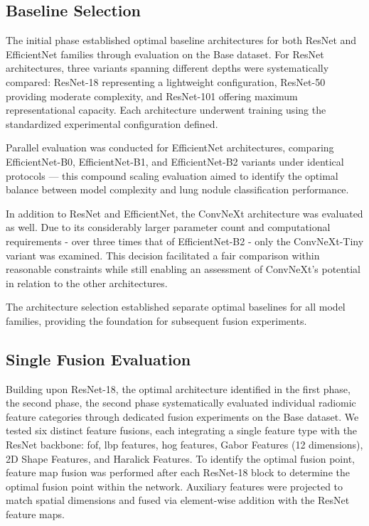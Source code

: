 \subsection{Baseline Selection}
The initial phase established optimal baseline architectures for both ResNet and EfficientNet families through evaluation on the Base dataset. For ResNet architectures, three variants spanning different depths were systematically compared: ResNet-18 representing a lightweight configuration, ResNet-50 providing moderate complexity, and ResNet-101 offering maximum representational capacity. Each architecture underwent training using the standardized experimental configuration defined.

Parallel evaluation was conducted for EfficientNet architectures, comparing EfficientNet-B0, EfficientNet-B1, and EfficientNet-B2 variants under identical protocols — this compound scaling evaluation aimed to identify the optimal balance between model complexity and lung nodule classification performance.

In addition to ResNet and EfficientNet, the ConvNeXt architecture was evaluated as well. Due to its considerably larger parameter count and computational requirements - over three times that of EfficientNet-B2 - only the ConvNeXt-Tiny variant was examined. This decision facilitated a fair comparison within reasonable constraints while still enabling an assessment of ConvNeXt's potential in relation to the other architectures.

The architecture selection established separate optimal baselines for all model families, providing the foundation for subsequent fusion experiments.

\subsection{Single Fusion Evaluation}
Building upon ResNet-18, the optimal architecture identified in the first phase, the second phase, the second phase systematically evaluated individual radiomic feature categories through dedicated fusion experiments on the Base dataset. We tested six distinct feature fusions, each integrating a single feature type with the ResNet backbone: \ac{fof}, \ac{lbp} features, \ac{hog} features, Gabor Features (12 dimensions), 2D Shape Features, and Haralick Features.
To identify the optimal fusion point, feature map fusion was performed after each ResNet-18 block to determine the optimal fusion point within the network. Auxiliary features were projected to match spatial dimensions and fused via element-wise addition with the ResNet feature maps. %

